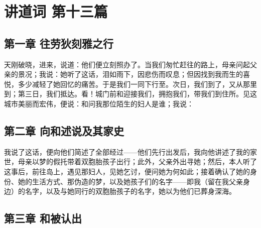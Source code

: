 \section{讲道词 第十三篇}


\subsection{第一章  往劳狄刻雅之行}

天刚破晓，进来，说道：他们便立刻照办了。当我们匆忙赶往的路上，母亲问起父亲的景况；我说：她听了这话，泪如雨下，因悲伤而叹息；但因找到我而生的喜悦，多少减轻了她回忆的痛苦。于是我们一同下行至。次日，我们到了，又从那里到；第三日，我们抵达。看！城门前和迎接我们，拥抱我们，带我们到住所。见这城市美丽而宏伟，便说：和问我那位陌生的妇人是谁；我说：\par


\subsection{第二章  向和述说及其家史}

我说了这话，便向他们简述了全部经过——他们先行出发后，我向他讲述了我的家世，母亲以梦的假托带着双胞胎孩子出行；此外，父亲外出寻她；然后，本人听了这事后，前往岛上，遇见那妇人，见她乞讨，便问她为何如此；接着确认了她的身份、她的生活方式、那伪造的梦，以及她孩子们的名字——即我（留在我父亲身边）的名字，以及与她同行的双胞胎孩子的名字，她以为他们已葬身深海。\par


\subsection{第三章  和被认出}

